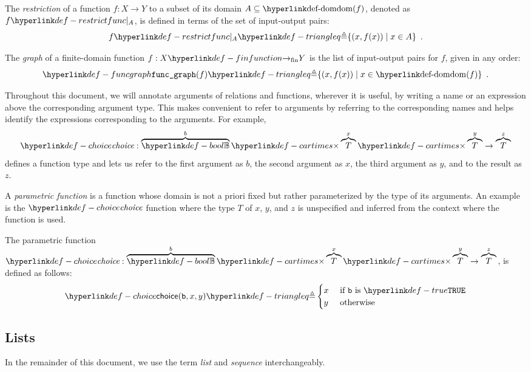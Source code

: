 \begin{definition}
\hypertarget{def-restrictfunc}{}
The \emph{restriction} of a function $f : X \rightarrow Y$ to a subset of its domain
$A \subseteq \dom(f)$, denoted as $\restrictfunc{f}{A}$, is defined
in terms of the set of input-output pairs:
\[
  \restrictfunc{f}{A} \triangleq \{ (x, f(x)) \;|\; x \in A \} \enspace.
\]
\end{definition}

\begin{definition}
\hypertarget{def-funcgraph}{}
The \emph{graph} of a finite-domain function $f : X \rightarrowfin Y$
is the list of input-output pairs for $f$, given in any order:
\[
\funcgraph(f) \triangleq \{ (x, f(x)) \;|\; x \in \dom(f) \} \enspace.
\]
\end{definition}

Throughout this document, we will annotate arguments of relations and functions, wherever it is useful,
by writing a name or an expression above the corresponding argument type.
This makes convenient to refer to arguments by referring to the corresponding names and helps identify
the expressions corresponding to the arguments.
For example,
\[
    \choicename : \overname{\Bool}{b} \cartimes \overname{T}{x} \cartimes \overname{T}{y} \rightarrow \overname{T}{z}
\]
defines a function type and lets us refer to the first argument as $b$, the second argument as $x$,
the third argument as $y$, and to the result as $z$.

A \emph{parametric function} is a function whose domain is not a priori fixed but rather
parameterized by the type of its arguments. An example is the $\choicename$ function where the type $T$ of
$x$, $y$, and $z$ is unspecified and inferred from the context where the function is used.

\hypertarget{def-choice}{}
\begin{definition}[Choice]
The parametric function $\choicename : \overname{\Bool}{b} \cartimes \overname{T}{x} \cartimes \overname{T}{y} \rightarrow \overname{T}{z}$,
is defined as follows:
\[
  \choice{\vb}{x}{y} \triangleq
  \begin{cases}
    x & \text{ if }\vb \text{ is }\True\\
    y & \text{ otherwise}\\
  \end{cases}
\]
\end{definition}

\subsection{Lists}
In the remainder of this document, we use the term \emph{list} and \emph{sequence} interchangeably.

